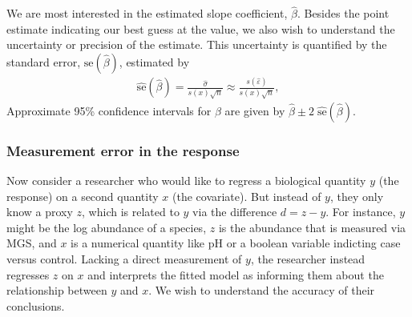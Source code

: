 \documentclass[
]{article}
\begin{document}
We are most interested in the estimated slope coefficient, \(\hat \beta\).
Besides the point estimate indicating our best guess at the value, we also wish to understand the uncertainty or precision of the estimate.
This uncertainty is quantified by the standard error, \(\text{se}(\hat \beta)\), estimated by
\begin{align}
  \label{eq:lm-se}
  \hat{\text{se}}(\hat \beta)
  = \frac{\hat \sigma}{s(x) \sqrt{n}}
  \approx \frac{s(\hat \varepsilon)}{s(x) \sqrt{n}},
\end{align}
Approximate 95\% confidence intervals for \(\beta\) are given by \(\hat \beta \pm 2\; \hat{\text{se}}(\hat \beta)\).

\hypertarget{measurement-error-in-the-response}{%
\subsubsection{Measurement error in the response}\label{measurement-error-in-the-response}}

Now consider a researcher who would like to regress a biological quantity \(y\) (the response) on a second quantity \(x\) (the covariate).
But instead of \(y\), they only know a proxy \(z\), which is related to \(y\) via the difference \(d = z - y\).
For instance, \(y\) might be the log abundance of a species, \(z\) is the abundance that is measured via MGS, and \(x\) is a numerical quantity like pH or a boolean variable indicting case versus control.
Lacking a direct measurement of \(y\), the researcher instead regresses \(z\) on \(x\) and interprets the fitted model as informing them about the relationship between \(y\) and \(x\).
We wish to understand the accuracy of their conclusions.
\end{document}
